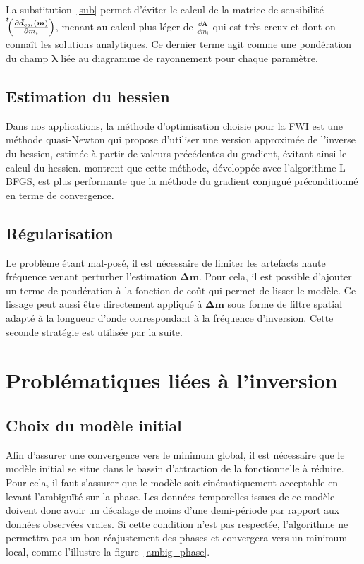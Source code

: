 La substitution~\ref{sub} permet d'éviter le calcul de la matrice de sensibilité $\tr{\left( \frac{\dd \bm{\tilde{d}}_{cal}(\bm{m}) }{\dd m_{i}} \right)}$, menant au calcul plus léger de $\frac{\dd \bm{A}}{\dd m_{i}}$ qui est très creux et dont on connaît les solutions analytiques. Ce dernier terme agit comme une pondération du champ $\bm{\lambda}$ liée au diagramme de rayonnement pour chaque paramètre.


\subsection{Estimation du hessien}

Dans nos applications, la méthode d'optimisation choisie pour la FWI est une méthode quasi-Newton qui propose d'utiliser une version approximée de l'inverse du hessien, estimée à partir de valeurs précédentes du gradient, évitant ainsi le calcul du hessien. \cite{brossier_2009} montrent que cette méthode, développée avec l'algorithme L-BFGS, est plus performante que la méthode du gradient conjugué préconditionné en terme de convergence. 


\subsection{Régularisation}

Le problème étant mal-posé, il est nécessaire de limiter les artefacts haute fréquence venant perturber l'estimation $\bm{\Delta m}$. Pour cela, il est possible d'ajouter un terme de pondération à la fonction de coût qui permet de lisser le modèle. Ce lissage peut aussi être directement appliqué à $\bm{\Delta m}$ sous forme de filtre spatial adapté à la longueur d'onde correspondant à la fréquence d'inversion. Cette seconde stratégie est utilisée par la suite.

\section{Problématiques liées à l'inversion}

\subsection{Choix du modèle initial \label{fwi:choix_modele}}
Afin d'assurer une convergence vers le minimum global, il est nécessaire que le modèle initial se situe dans le bassin d'attraction de la fonctionnelle à réduire. Pour cela, il faut s'assurer que le modèle soit cinématiquement acceptable en levant l’ambiguïté sur la phase. Les données temporelles issues de ce modèle doivent donc avoir un décalage de moins d'une demi-période par rapport aux données observées vraies. Si cette condition n'est pas respectée, l'algorithme ne permettra pas un bon réajustement des phases et convergera vers un minimum local, comme l'illustre la figure~\ref{ambig_phase}.%

